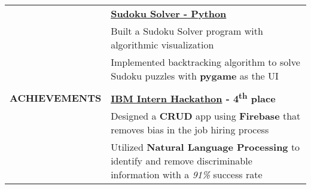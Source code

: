 \documentclass[letterpaper,11pt,oneside]{article}
\newcommand\tabitem{\makebox[1em][r]{-~~}} %
\newcommand\tabspace{\makebox[1em][r]{~~~}} %
\begin{document}
\begin{tabular}{@{}p{1.15in} p{6.08in}@{}}
     &\textbf{\href{https://github.com/nathancheung22/Sudoku-Solver}{Sudoku Solver - Python}} \\
     & \tabitem Built a Sudoku Solver program with algorithmic visualization \\
     & \tabitem Implemented backtracking algorithm to solve Sudoku puzzles with \textbf{pygame} as the UI \\
     & \\

 \textbf{ACHIEVEMENTS}
     & \textbf{\href{https://www.ibm.com/blogs/jobs/2020/08/19/winning-projects-of-the-ibm-north-america-intern-hackathon/}{IBM Intern Hackathon} - 4\textsuperscript{th} place} \\
     & \tabitem Designed a \textbf{CRUD} app using \textbf{Firebase} that removes bias in the job hiring process \\
     & \tabitem Utilized \textbf{Natural Language Processing} to identify and remove discriminable information \tabspace with a \textit{91\%} success rate \\
     

\end{tabular}
\end{document}
